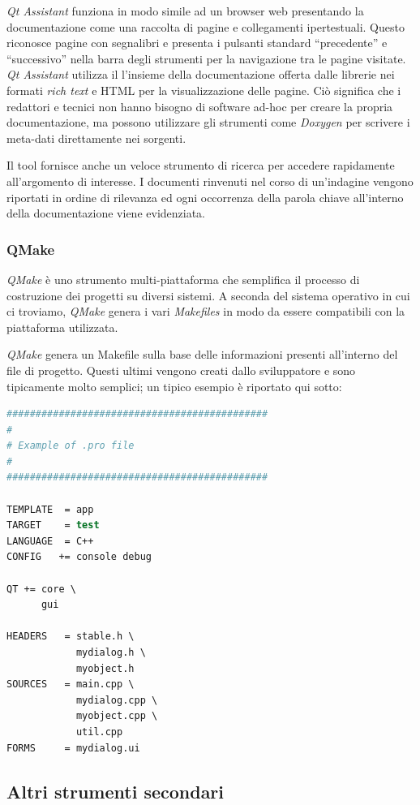 \emph{Qt Assistant} funziona in modo simile ad un browser web presentando la documentazione come una raccolta di pagine e collegamenti ipertestuali. Questo riconosce pagine con segnalibri e presenta i pulsanti standard ``precedente'' e ``successivo'' nella barra degli strumenti per la navigazione tra le pagine visitate. \emph{Qt Assistant} utilizza il l'insieme della documentazione offerta dalle librerie \qt{} nei formati \emph{rich text} e HTML per la visualizzazione delle pagine. Ciò significa che i redattori e tecnici non hanno bisogno di software ad-hoc per creare la propria documentazione, ma possono utilizzare gli strumenti come \emph{Doxygen} per scrivere i meta-dati direttamente nei sorgenti.

Il tool fornisce anche un veloce strumento di ricerca per accedere rapidamente all'argomento di interesse. I documenti rinvenuti nel corso di un'indagine vengono riportati in ordine di rilevanza ed ogni occorrenza della parola chiave all'interno della documentazione viene evidenziata.

\subsubsection{QMake}
\emph{QMake} è uno strumento multi-piattaforma che semplifica il processo di costruzione dei progetti \qt{} su diversi sistemi. A seconda del sistema operativo in cui ci troviamo, \emph{QMake} genera i vari  \emph{Makefiles} in modo da essere compatibili con la piattaforma utilizzata.

\emph{QMake} genera un Makefile sulla base delle informazioni presenti all'interno del file di progetto. Questi ultimi vengono creati dallo sviluppatore e sono tipicamente molto semplici; un tipico esempio è riportato qui sotto:

\begin{lstlisting}[language=csh]
#############################################
#
# Example of .pro file
#
#############################################

TEMPLATE  = app
TARGET    = test
LANGUAGE  = C++
CONFIG   += console debug

QT += core \
      gui

HEADERS   = stable.h \
            mydialog.h \
            myobject.h
SOURCES   = main.cpp \
            mydialog.cpp \
            myobject.cpp \
            util.cpp
FORMS     = mydialog.ui
\end{lstlisting}

\subsection{Altri strumenti secondari}

